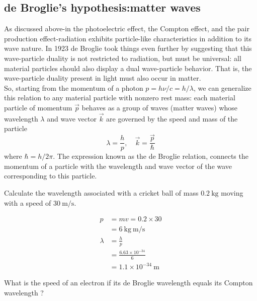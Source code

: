\subsection{de Broglie's hypothesis:matter waves}
As discussed above-in the photoelectric effect, the Compton effect, and the pair production effect-radiation exhibits particle-like characteristics in addition to its wave nature. In 1923 de Broglie took things even further by suggesting that this wave-particle duality is not restricted to radiation, but must be universal: all material particles should also display a dual wave-particle behavior. That is, the wave-particle duality present in light must also occur in matter.\\
So, starting from the momentum of a photon $p=h \nu / c=h / \lambda$, we can generalize this relation to any material particle  with nonzero rest mass: each material particle of momentum $\vec{p}$ behaves as a group of waves (matter waves) whose wavelength $\lambda$ and wave vector $\vec{k}$ are governed by the speed and mass of the particle\\
$$\lambda=\frac{h}{p}, \quad \vec{k}=\frac{\vec{p}}{\hbar}$$
where $\hbar=h / 2 \pi$. The expression known as the de Broglie relation, connects the momentum of a particle with the wavelength and wave vector of the wave corresponding to this particle.\\
\begin{exercise}
	Calculate the wavelength associated with a cricket ball of mass $0.2 \mathrm{~kg}$ moving with a speed of $30 \mathrm{~m} / \mathrm{s}$.
\end{exercise}
\begin{answer}
	\begin{align*}
	p&=m v=0.2 \times 30\\&=6 \mathrm{~kg} \mathrm{~m} / \mathrm{s} \\
	\lambda&=\frac{h}{p}\\&=\frac{6.63 \times 10^{-34}}{6}\\&=1.1 \times 10^{-34} \mathrm{~m}
	\end{align*}
\end{answer}
\begin{exercise}
	What is the speed of an electron if its de Broglie wavelength equals its Compton wavelength ?
\end{exercise}
